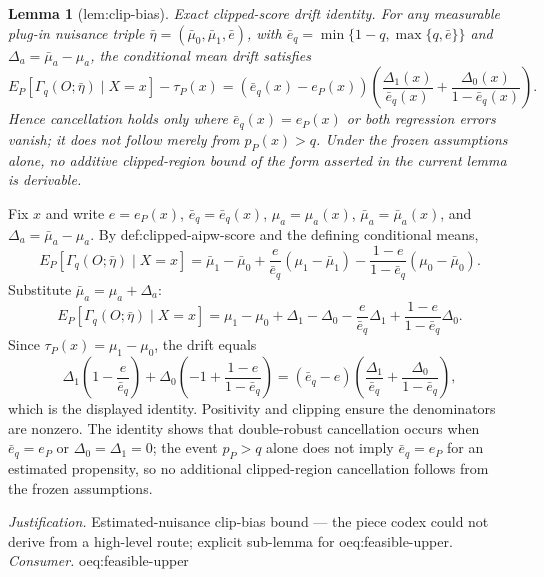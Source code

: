\documentclass{article}
\newtheorem{lemma}{Lemma}
\begin{document}
\begin{lemma}[lem:clip-bias]\label{lem:clip-bias}
Exact clipped-score drift identity. For any measurable plug-in nuisance triple \(\bar\eta=(\bar\mu_0,\bar\mu_1,\bar e)\), with \(\bar e_q=\min\{1-q,\max\{q,\bar e\}\}\) and \(\Delta_a=\bar\mu_a-\mu_a\), the conditional mean drift satisfies
\[
E_P[\Gamma_q(O;\bar\eta)\mid X=x]-\tau_P(x)
=(\bar e_q(x)-e_P(x))\left(\frac{\Delta_1(x)}{\bar e_q(x)}+\frac{\Delta_0(x)}{1-\bar e_q(x)}\right).
\]
Hence cancellation holds only where \(\bar e_q(x)=e_P(x)\) or both regression errors vanish; it does not follow merely from \(p_P(x)>q\). Under the frozen assumptions alone, no additive clipped-region bound of the form asserted in the current lemma is derivable.
\end{lemma}
Fix \(x\) and write \(e=e_P(x)\), \(\bar e_q=\bar e_q(x)\), \(\mu_a=\mu_a(x)\), \(\bar\mu_a=\bar\mu_a(x)\), and \(\Delta_a=\bar\mu_a-\mu_a\). By def:clipped-aipw-score and the defining conditional means,
\[
E_P[\Gamma_q(O;\bar\eta)\mid X=x]
=\bar\mu_1-\bar\mu_0+\frac{e}{\bar e_q}(\mu_1-\bar\mu_1)-\frac{1-e}{1-\bar e_q}(\mu_0-\bar\mu_0).
\]
Substitute \(\bar\mu_a=\mu_a+\Delta_a\):
\[
E_P[\Gamma_q(O;\bar\eta)\mid X=x]
=\mu_1-\mu_0+\Delta_1-\Delta_0-\frac{e}{\bar e_q}\Delta_1+\frac{1-e}{1-\bar e_q}\Delta_0.
\]
Since \(\tau_P(x)=\mu_1-\mu_0\), the drift equals
\[
\Delta_1\left(1-\frac{e}{\bar e_q}\right)
+\Delta_0\left(-1+\frac{1-e}{1-\bar e_q}\right)
=(\bar e_q-e)\left(\frac{\Delta_1}{\bar e_q}+\frac{\Delta_0}{1-\bar e_q}\right),
\]
which is the displayed identity. Positivity and clipping ensure the denominators are nonzero. The identity shows that double-robust cancellation occurs when \(\bar e_q=e_P\) or \(\Delta_0=\Delta_1=0\); the event \(p_P>q\) alone does not imply \(\bar e_q=e_P\) for an estimated propensity, so no additional clipped-region cancellation follows from the frozen assumptions.
\par\smallskip\noindent \textit{Justification.} Estimated-nuisance clip-bias bound — the piece codex could not derive from a high-level route; explicit sub-lemma for oeq:feasible-upper. \textit{Consumer.} oeq:feasible-upper
\end{document}
